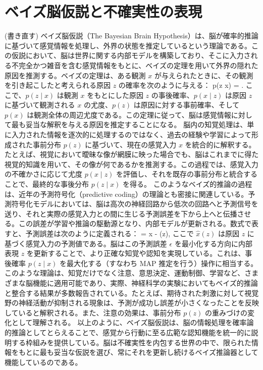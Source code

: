 \section{ベイズ脳仮説と不確実性の表現}
(書き直す)
ベイズ脳仮説（The Bayesian Brain Hypothesis）は、脳が確率的推論に基づいて感覚情報を処理し、外界の状態を推定しているという理論である。この仮説において、脳は世界に関する内部モデルを構築しており、そこに入力される不完全かつ雑音を含む感覚情報をもとに、ベイズの定理を用いて外界の隠れた原因を推測する。ベイズの定理は、ある観測 $x$ が与えられたときに、その観測を引き起こしたと考えられる原因 $z$ の確率を次のように与える：
p(z \mid x) = .
ここで、$p(z \mid x)$ は観測 $x$ をもとにした原因 $z$ の事後確率、$p(x \mid z)$ は原因 $z$ に基づいて観測される $x$ の尤度、$p(z)$ は原因に対する事前確率、そして $p(x)$ は観測全体の周辺尤度である。この定理に従って、脳は感覚情報に対して最も妥当な解釈を与える原因を推定することになる。
脳内の知覚処理は、単に入力された情報を逐次的に処理するのではなく、過去の経験や学習によって形成された事前分布 $p(z)$ に基づいて、現在の感覚入力 $x$ を統合的に解釈する。たとえば、視覚において曖昧な像が網膜に映った場合でも、脳はこれまでに得た視覚的知識を用いて、その像が何であるかを推測する。この過程では、感覚入力の不確かさに応じて尤度 $p(x \mid z)$ を評価し、それを既存の事前分布と統合することで、最終的な事後分布 $p(z \mid x)$ を得る。
このようなベイズ的推論の過程は、近年の予測符号化（predictive coding）の理論とも密接に関連している。予測符号化モデルにおいては、脳は高次の神経回路から低次の回路へと予測信号を送り、それと実際の感覚入力との間に生じる予測誤差を下から上へと伝播させる。この誤差が学習や推論の駆動源となり、内部モデルが更新される。数式で表すと、予測誤差は次のように定義される：
\epsilon = x - (z),
ここで $\hat{x}(z)$ は原因 $z$ に基づく感覚入力の予測値である。脳はこの予測誤差 $\epsilon$ を最小化する方向に内部表現 $z$ を更新することで、より正確な知覚や認知を実現している。これは、事後確率 $p(z \mid x)$ を最大化する（すなわち MAP 推定を行う）操作に相当する。
このような理論は、知覚だけでなく注意、意思決定、運動制御、学習など、さまざまな脳機能に適用可能であり、実際、神経科学の実験においてもベイズ的推論と整合する結果が多数報告されている。たとえば、期待された刺激に対して視覚野の神経活動が抑制される現象は、予測が成功し誤差が小さくなったことを反映していると解釈される。また、注意の効果は、事前分布 $p(z)$ の重みづけの変化として理解される。
以上のように、ベイズ脳仮説は、脳の情報処理を確率論的推論としてとらえることで、感覚から行動に至る広範な認知機能を統一的に説明する枠組みを提供している。脳は不確実性を内包する世界の中で、限られた情報をもとに最も妥当な仮説を選び、常にそれを更新し続けるベイズ推論器として機能しているのである。
